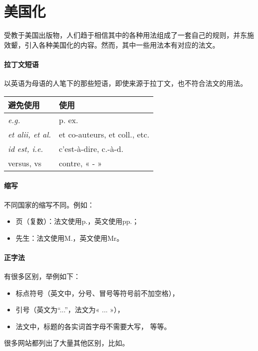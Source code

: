 \section{美国化}

受教于美国出版物，人们趋于相信其中的各种用法组成了一套自己的规则，并东施效颦，引入各种美国化的内容。然而，其中一些用法本有对应的法文。

\paragraph*{拉丁文短语} 以英语为母语的人笔下的那些短语，即使来源于拉丁文，也不符合法文的用法。

\begin{center}
    \begin{tabular}{|l|l|}
        \hline
        避免使用 & 使用 \\
        \hline
        \emph{e.g.} & p. ex. \\
        \emph{et alii, et al.} & et co-auteurs, et coll., etc.\\
        \emph{id est, i.e.} & c'est-à-dire, c.-à-d.\\
        versus, vs & contre, « - » \\
        \hline
    \end{tabular}
\end{center}

\paragraph*{缩写} 不同国家的缩写不同。例如：

\begin{itemize}
    \item 页（复数）：法文使用p.，英文使用pp.；
    \item 先生：法文使用M.，英文使用Mr。
\end{itemize}

\paragraph*{正字法} 有很多区别，举例如下：

\begin{itemize}
    \item 标点符号（英文中，分号、冒号等符号前不加空格），
    \item 引号（英文为``...''，法文为« ... »），
    \item 法文中，标题的各实词首字母不需要大写，
    等等。
\end{itemize}

很多网站都列出了大量其他区别，比如。